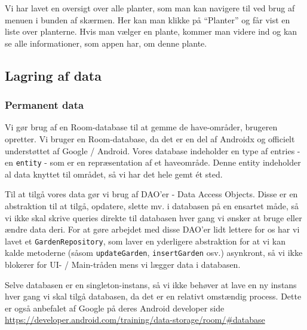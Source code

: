 Vi har lavet en oversigt over alle planter, som man kan navigere til ved brug af menuen i bunden af skærmen. Her kan man klikke på ``Planter'' og får vist en liste over planterne. Hvis man vælger en plante, kommer man videre ind og kan se alle informationer, som appen har, om denne plante.

\subsection{Lagring af data}

\subsubsection{Permanent data}
Vi gør brug af en Room-database til at gemme de have-områder, brugeren opretter. Vi bruger en Room-database, da det er en del af Androidx og officielt understøttet af Google / Android. Vores database indeholder en type af entries - en \texttt{entity} - som er en repræsentation af et haveområde. Denne entity indeholder al data knyttet til området, så vi har det hele gemt ét sted.

Til at tilgå vores data gør vi brug af DAO'er - Data Access Objects. Disse er en abstraktion til at tilgå, opdatere, slette mv. i databasen på en ensartet måde, så vi ikke skal skrive queries direkte til databasen hver gang vi ønsker at bruge eller ændre data deri.
For at gøre arbejdet med disse DAO'er lidt lettere for os har vi lavet et \texttt{GardenRepository}, som laver en yderligere abstraktion for at vi kan kalde metoderne (såsom \texttt{updateGarden}, \texttt{insertGarden} osv.) asynkront, så vi ikke blokerer for UI- / Main-tråden mens vi lægger data i databasen.

Selve databasen er en singleton-instans, så vi ikke behøver at lave en ny instans hver gang vi skal tilgå databasen, da det er en relativt omstændig process. Dette er også anbefalet af Google på deres Android developer side \hyperlink{https://developer.android.com/training/data-storage/room/#database}{https://developer.android.com/training/data-storage/room/#database}
